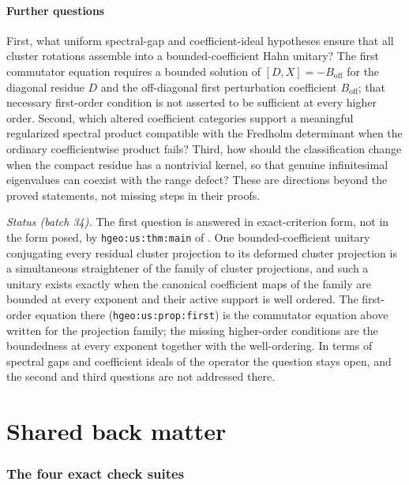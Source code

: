 \documentclass[11pt,a4paper]{article}
\numberwithin{equation}{section}
\theoremstyle{definition}
\theoremstyle{remark}
\begin{document}
\subsection{Further questions}\label{ihs:fr:sec:questions}
First, what uniform spectral-gap and coefficient-ideal hypotheses ensure that
all cluster rotations assemble into a bounded-coefficient Hahn unitary? The
first commutator equation requires a bounded solution of
$[D,X]=-B_{\mathrm{off}}$ for the diagonal residue $D$ and the off-diagonal
first perturbation coefficient $B_{\mathrm{off}}$; that necessary first-order
condition is not asserted to be sufficient at every higher order. Second,
which altered coefficient categories support a meaningful regularized
spectral product compatible with the Fredholm determinant when the ordinary
coefficientwise product fails? Third, how should the classification change
when the compact residue has a nontrivial kernel, so that genuine
infinitesimal eigenvalues can coexist with the range defect? These are
directions beyond the proved statements, not missing steps in their proofs.

\emph{Status (batch 34).} The first question is answered in exact-criterion
form, not in the form posed, by \texttt{hgeo:us:thm:main} of
. One bounded-coefficient unitary
conjugating every residual cluster projection to its deformed cluster
projection is a simultaneous straightener of the family of cluster
projections, and such a unitary exists exactly when the canonical coefficient
maps of the family are bounded at every exponent and their active support is
well ordered. The first-order equation there (\texttt{hgeo:us:prop:first}) is
the commutator equation above written for the projection family; the missing
higher-order conditions are the boundedness at every exponent together with the
well-ordering. In terms of spectral gaps and coefficient ideals of the
operator the question stays open, and the second and third questions are not
addressed there.

\clearpage
\part*{Shared back matter}

\section{The four exact check suites}\label{ihs:sec:checks}
\end{document}
